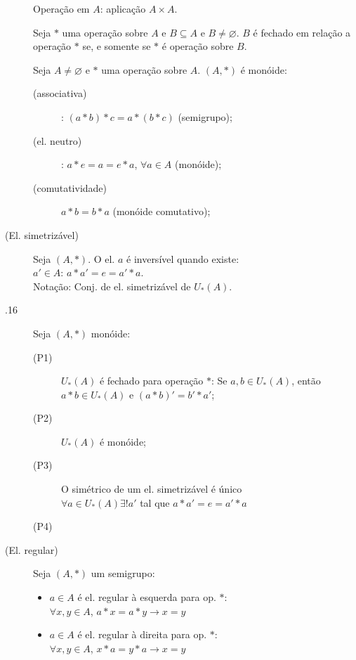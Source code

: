 \documentclass[11pt]{article}
\begin{document}
\begin{description}
  \item[] Operação em $A$: aplicação $A \times A$.
  \item[] Seja $*$ uma operação sobre $A$ e $B \subseteq A$ e $B \neq
    \varnothing$. $B$ é fechado em relação a operação $*$ se, e somente se $*$ é
    operação sobre $B$.
  \item[] Seja $A \neq \varnothing$ e $*$ uma operação sobre $A$. $(A, *)$ é
    monóide:
    \begin{description}
      \item[(associativa)]: $(a*b)*c = a*(b*c)$ (semigrupo);
      \item[(el. neutro)]: $a*e=a=e*a$, $\forall a \in A$ (monóide);
      \item[(comutatividade)] $a*b=b*a$ (monóide comutativo);
    \end{description}
  \item[ (El. simetrizável)] Seja $(A, *)$. O el. $a$ é inversível quando
    existe: \\
    $a' \in A$: $a*a' = e = a' * a$. \\
    Notação: Conj. de el. simetrizável de $U_* (A)$.
  \item[.16] Seja $(A, *)$ monóide:
    \begin{description}
      \item[(P1)] $U_* (A)$ é fechado para operação $*$: Se $a,b \in U_* (A)$,
        então $a*b \in U_* (A)$ e $(a*b)' = b' * a'$;
      \item[(P2)] $U_* (A)$ é monóide;
      \item[(P3)] O simétrico de um el. simetrizável é único \\
        $\forall a \in U_* (A) \exists !a'$ tal que $a*a' = e = a' *a$
      \item[(P4)]
    \end{description}
  \item[ (El. regular)] Seja $(A, *)$ um semigrupo:
    \begin{itemize}
      \item $a \in A$ é el. regular à esquerda para op. $*$: \\
        $\forall x,y \in A$, $a*x = a*y \to x=y$
      \item $a \in A$ é el. regular à direita para op. $*$: \\
        $\forall x,y \in A$, $x*a = y*a \to x=y$
    \end{itemize}
\end{description}
\end{document}
